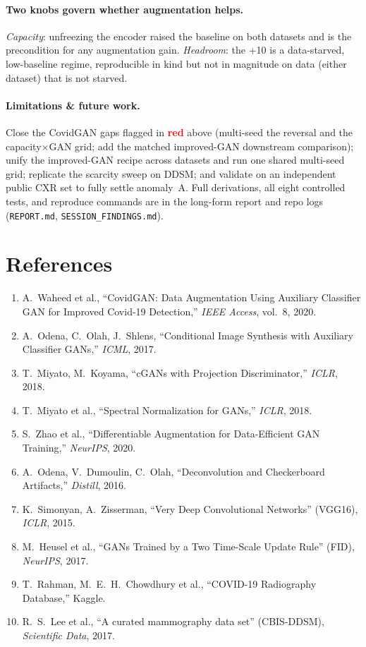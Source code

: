 \documentclass[11pt]{article}
\newcommand{\code}[1]{\texttt{#1}}
\begin{document}
\paragraph{Two knobs govern whether augmentation helps.} \emph{Capacity}: unfreezing
the encoder raised the baseline on both datasets and is the precondition for any
augmentation gain. \emph{Headroom}: the +10 is a data-starved, low-baseline regime,
reproducible in kind but not in magnitude on data (either dataset) that is not
starved.

\paragraph{Limitations \& future work.} Close the CovidGAN gaps flagged in
\textcolor{red}{\textbf{red}} above (multi-seed the reversal and the capacity$\times$GAN
grid; add the matched improved-GAN downstream comparison); unify the improved-GAN
recipe across datasets and run one shared multi-seed grid; replicate the scarcity
sweep on DDSM; and validate on an independent public CXR set to fully settle
anomaly~A. Full derivations, all eight controlled tests, and reproduce commands are in
the long-form report and repo logs (\code{REPORT.md}, \code{SESSION_FINDINGS.md}).

\section*{References}
\begin{enumerate}[nosep,leftmargin=1.6em]
  \item A.~Waheed et al., ``CovidGAN: Data Augmentation Using Auxiliary Classifier GAN
        for Improved Covid-19 Detection,'' \emph{IEEE Access}, vol.~8, 2020.
  \item A.~Odena, C.~Olah, J.~Shlens, ``Conditional Image Synthesis with Auxiliary
        Classifier GANs,'' \emph{ICML}, 2017.
  \item T.~Miyato, M.~Koyama, ``cGANs with Projection Discriminator,'' \emph{ICLR}, 2018.
  \item T.~Miyato et al., ``Spectral Normalization for GANs,'' \emph{ICLR}, 2018.
  \item S.~Zhao et al., ``Differentiable Augmentation for Data-Efficient GAN Training,''
        \emph{NeurIPS}, 2020.
  \item A.~Odena, V.~Dumoulin, C.~Olah, ``Deconvolution and Checkerboard Artifacts,''
        \emph{Distill}, 2016.
  \item K.~Simonyan, A.~Zisserman, ``Very Deep Convolutional Networks'' (VGG16),
        \emph{ICLR}, 2015.
  \item M.~Heusel et al., ``GANs Trained by a Two Time-Scale Update Rule'' (FID),
        \emph{NeurIPS}, 2017.
  \item T.~Rahman, M.~E.~H.~Chowdhury et al., ``COVID-19 Radiography Database,'' Kaggle.
  \item R.~S.~Lee et al., ``A curated mammography data set'' (CBIS-DDSM),
        \emph{Scientific Data}, 2017.
\end{enumerate}
\end{document}
